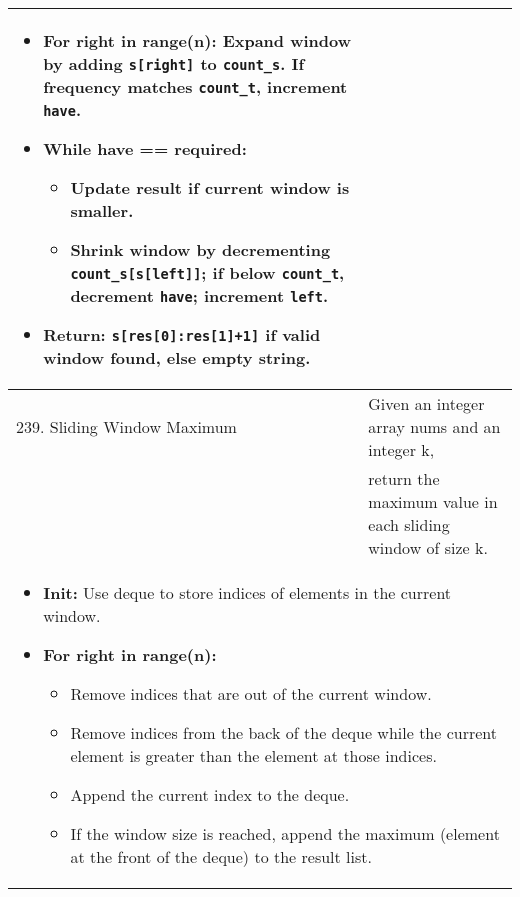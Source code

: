 \begin{summary}
\begin{center}
\begin{tabular}{ll}
{\begin{itemize}
                    \item \textbf{For right in range(n):} Expand window by adding \texttt{s[right]} to \texttt{count\_s}. If frequency matches \texttt{count\_t}, increment \texttt{have}.
                    
                    \item \textbf{While have == required:}
                    \begin{itemize}
                        \item Update result if current window is smaller.
                        \item Shrink window by decrementing \texttt{count\_s[s[left]]}; if below \texttt{count\_t}, decrement \texttt{have}; increment \texttt{left}.
                    \end{itemize}
                    
                    \item \textbf{Return:} \texttt{s[res[0]:res[1]+1]} if valid window found, else empty string.
                \end{itemize}                
            } \\
            \midrule
            239. Sliding Window Maximum & Given an integer array nums and an integer k, \\
            & return the maximum value in each sliding window of size k. \\
            \multicolumn{2}{p{\linewidth}}{
                \begin{itemize}
                    \item \textbf{Init:} Use deque to store indices of elements in the current window. 
                    \item \textbf{For right in range(n):} 
                    \begin{itemize}
                        \item Remove indices that are out of the current window.
                        \item Remove indices from the back of the deque while the current element is greater than the element at those indices.
                        \item Append the current index to the deque.
                        \item If the window size is reached, append the maximum (element at the front of the deque) to the result list.
                    \end{itemize}
                \end{itemize}
            } \\
            \bottomrule
        \end{tabular}
    \end{center}
\end{summary}